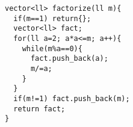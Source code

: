 \begin{verbatim}
vector<ll> factorize(ll m){
  if(m==1) return{};
  vector<ll> fact;
  for(ll a=2; a*a<=m; a++){
    while(m%a==0){
      fact.push_back(a);
      m/=a;
    }
  }
  if(m!=1) fact.push_back(m);
  return fact;
}
\end{verbatim}